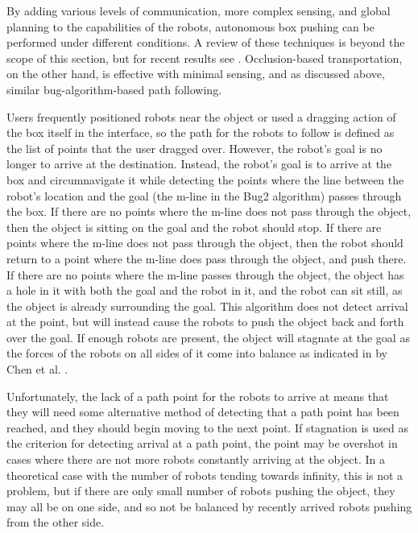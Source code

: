 By adding various levels of communication, more complex sensing, and global planning to the capabilities of the robots, autonomous box pushing can be performed under different conditions. 
A review of these techniques is beyond the scope of this section, but for recent results see \citep{tuci2018cooperative, rahimi2018comparison, alkilabi2017cooperative}. 
Occlusion-based transportation, on the other hand, is effective with minimal sensing, and as discussed above, similar bug-algorithm-based path following. 

Users frequently positioned robots near the object or used a dragging action of the box itself in the interface, so the path for the robots to follow is defined as the list of points that the user dragged over. 
However, the robot's goal is no longer to arrive at the destination.
Instead, the robot's goal is to arrive at the box and circumnavigate it while detecting the points where the line between the robot's location and the goal (the m-line in the Bug2 algorithm) passes through the box. 
If there are no points where the m-line does not pass through the object, then the object is sitting on the goal and the robot should stop. 
If there are points where the m-line does not pass through the object, then the robot should return to a point where the m-line does pass through the object, and push there. 
If there are no points where the m-line passes through the object, the object has a hole in it with both the goal and the robot in it, and the robot can sit still, as the object is already surrounding the goal.
This algorithm does not detect arrival at the point, but will instead cause the robots to push the object back and forth over the goal. 
If enough robots are present, the object will stagnate at the goal as the forces of the robots on all sides of it come into balance as indicated in by Chen et al. \cite{chen2015occlusion}.

Unfortunately, the lack of a path point for the robots to arrive at means that they will need some alternative method of detecting that a path point has been reached, and they should begin moving to the next point. 
If stagnation is used as the criterion for detecting arrival at a path point, the point may be overshot in cases where there are not more robots constantly arriving at the object.
In a theoretical case with the number of robots tending towards infinity, this is not a problem, but if there are only small number of robots pushing the object, they may all be on one side, and so not be balanced by recently arrived robots pushing from the other side. 

